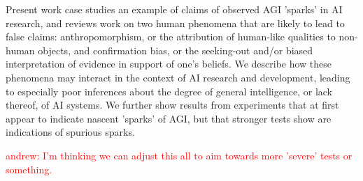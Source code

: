 \documentclass{article}
\theoremstyle{plain}
\theoremstyle{definition}
\theoremstyle{remark}
\begin{document}
Present work case studies an example of claims of observed AGI 'sparks' in AI research, and reviews work on two human phenomena that are likely to lead to false claims: anthropomorphism, or the attribution of human-like qualities to non-human objects, and confirmation bias, or the seeking-out and/or biased interpretation of evidence in support of one's beliefs. We describe how these phenomena may interact in the context of AI research and development, leading to especially poor inferences about the degree of general intelligence, or lack thereof, of AI systems. We further show results from experiments that at first appear to indicate nascent 'sparks' of AGI, but that stronger tests show are indications of spurious sparks. 

\textcolor{red}{andrew: I'm thinking we can adjust this all to aim towards more 'severe' tests or something. }


\end{document}
